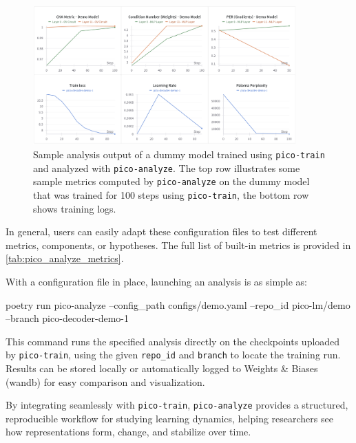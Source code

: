 \begin{figure}[t]
    \centering
    \includegraphics[width=0.9\textwidth]{chapters/pico/figures/demo_full_run.png}
    \caption{Sample analysis output of a dummy model trained using \texttt{pico-train} and analyzed with \texttt{pico-analyze}. The top row illustrates some sample metrics computed by \texttt{pico-analyze} on the dummy model that was trained for 100 steps using \texttt{pico-train}, the bottom row shows training logs.}
    \label{fig:demo_full_run}
\end{figure}

In general, users can easily adapt these configuration files to test different metrics, components, or hypotheses. The full list of built-in metrics is provided in \cref{tab:pico_analyze_metrics}.

With a configuration file in place, launching an analysis is as simple as:

\begin{center}
    \begin{codelisting}
    poetry run pico-analyze
        --config_path configs/demo.yaml
        --repo_id pico-lm/demo
        --branch pico-decoder-demo-1
    \end{codelisting}
\end{center}

This command runs the specified analysis directly on the checkpoints uploaded by \texttt{pico-train}, using the given \verb|repo_id| and \verb|branch| to locate the training run. Results can be stored locally or automatically logged to Weights \& Biases (wandb) \citep{wandb} for easy comparison and visualization.

By integrating seamlessly with \texttt{pico-train}, \texttt{pico-analyze} provides a structured, reproducible workflow for studying learning dynamics, helping researchers see how representations form, change, and stabilize over time.

